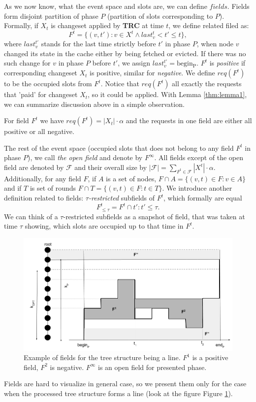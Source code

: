 As we now know, what the event space and slots are, we can define $fields$. Fields 
form disjoint partition of phase $P$ (partition of slots corresponding 
to $P$). Formally, if $X_t$ is changeset applied by \textbf{TRC} at time $t$, we 
define related filed as:
$$F^t = \{(v, t'): v \in X^t \wedge last_v^t < t' \leq t\},$$
where $last_v^{t'}$ stands for the last time strictly before $t'$ in phase $P$, 
when node $v$ changed its state in the cache either by being fetched or evicted. If 
there was no such change for $v$ in phase $P$ before $t'$, we assign 
$last_v^{t'} = \mathrm{begin_P}$. $F^t$ is \textit{positive} if corresponding 
changeset $X_t$ is positive, similar for \textit{negative}. We define $req(F^t)$ 
to be the occupied slots from $F^t$. Notice that $req(F^t)$ all exactly the
requests that 'paid' for changeset $X_t$, so it could be applied. With Lemma \ref{thm:lemma1},
we can summarize discussion above in a simple observation.
\begin{observe}
For field $F^t$ we have $req(F^t) = |X_t| \cdot \alpha$ and the requests 
in one field are either all positive or all negative.
\label{obs:observe1}
\end{observe}
The rest of the event space (occupied slots that does not belong to any field $F^t$ 
in phase $P$), we call \textit{the open field} and denote by $F^{\infty}$. All 
fields except of the open field are denoted by $\mathcal{F}$ and their overall size
by $|\mathcal{F}| = \sum_{F^t \in \mathcal{F}} |X^t| \cdot \alpha$.
Additionally, for any field $F$, if $A$ is a set of nodes, $F \cap A = \{(v,t) 
\in F: v \in A\}$ and if $T$ is set of rounds $F \cap T = \{(v, t) \in F: t \in 
T\}$. We introduce another definition related to fields: $\tau$\textit{-restricted} subfields of 
$F^t$, which formally are equal
$$F^t_{\leq \tau} = F^t \cap {t': t' \leq \tau}.$$
We can think of a $\tau$-restricted subfields as a snapshot of field, that was taken at time $\tau$
showing, which slots are occupied up to that time in $F^t$.
\begin{figure}
\begin{center}
  \includegraphics[width=1.1\textwidth]{fields.png}
\end{center}
\caption{Example of fields for the tree structure being a line. $F^1$ is a positive field, 
$F^2$ is negative. $F^{\infty}$ is an open field for presented phase.}
\label{fig:fields}
\end{figure}
Fields are hard to visualize in general case, so we present them 
only for the case when the processed tree structure forms a line (look at the figure 
Figure \ref{fig:fields}).

